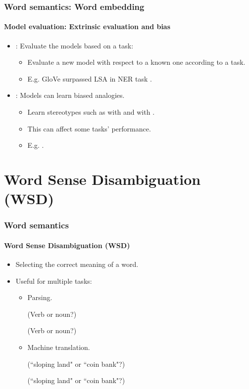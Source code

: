 \documentclass[xcolor=table]{beamer}
\begin{document}
\begin{frame}
\frametitle{Word semantics: Word embedding}
\framesubtitle{Model evaluation: Extrinsic evaluation and bias}
	
\begin{itemize}
	\item  {}: Evaluate the models based on a task:
	\begin{itemize}
		\item Evaluate a new model with respect to a known one according to a task.
		\item E.g. GloVe surpassed LSA in NER task \cite{2014-pennington-al}.
	\end{itemize}
	\item {}: Models can learn biased analogies.
	\begin{itemize}
		\item Learn stereotypes such as  with  and  with  \cite{2017-caliskan-al}.
		\item This can affect some tasks' performance. 
		\item E.g. .
	\end{itemize}
\end{itemize}
	
\end{frame}

\section{Word Sense Disambiguation (WSD)}

\begin{frame}
\frametitle{Word semantics}
\framesubtitle{Word Sense Disambiguation (WSD)}

\begin{itemize}
	\item Selecting the correct meaning of a word.
	\item Useful for multiple tasks:
	\begin{itemize}
		\item Parsing.
		
		 (Verb or noun?)
		
		 (Verb or noun?)
		
		\item Machine translation.
		
		 (``sloping land" or ``coin bank"?)
		
		 (``sloping land" or ``coin bank"?)
	\end{itemize}
\end{itemize}

\end{frame}
\end{document}
